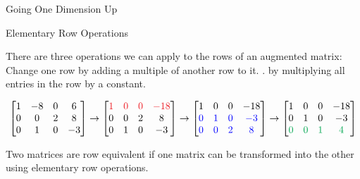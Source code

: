 \documentclass[xcolor=dvipsnames,aspectratio=169,t]{beamer}
\begin{document}
\begin{frame}{Going One Dimension Up}
  
\end{frame}

\begin{frame}{Elementary Row Operations}

  There are three operations we can apply to the rows of an augmented matrix:
  \bb
  \ii Change one row by \alert{adding a multiple of another row to it}.
  \ii {}.
  \ii {} by multiplying all entries in the row by a  constant.
  \ee

  \[
    \begin{bmatrix}
      1 & -8 & 0 & 6 \\
      0 & 0 & 2 & 8 \\
      0 & 1 & 0 & -3
    \end{bmatrix}
    \rightarrow 
    \begin{bmatrix}
      \colorr{1} & \colorr{0} & \colorr{0} & \colorr{-18} \\
      0 & 0 & 2 & 8 \\
      0 & 1 & 0 & -3
    \end{bmatrix}
    \rightarrow
    \begin{bmatrix}
      1 & 0 & 0 & -18 \\
      \colorb{0} & \colorb{1} & \colorb{0} & \colorb{-3} \\
      \colorb{0} & \colorb{0} & \colorb{2} & \colorb{8} 
    \end{bmatrix}
    \rightarrow
    \begin{bmatrix}
      1 & 0 & 0 & -18 \\
      0 & 1 & 0 & -3\\
      \colorg{0} & \colorg{0} & \colorg{1} & \colorg{4} 
    \end{bmatrix}
  \]
  \bigskip
 
  \pause
  \bbox
  Two matrices are \alert{row equivalent} if one matrix can be transformed into the other using elementary row operations.
  \ebox
 
\end{frame}
 
\end{document}
